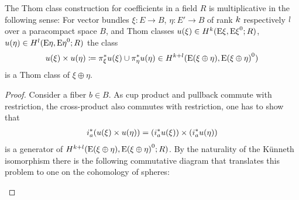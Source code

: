 \begin{Cor}\label{cor:thomclassmultiplicative} %
  The Thom class construction for coefficients in a field $R$ is
  multiplicative in the following sense:
  For vector bundles $\xi\colon E\to B$, $\eta\colon E'\to B$
  of rank $k$ respectively $l$ over a paracompact space $B$, and Thom
  classes
  ${u}(\xi)\in H^{k}(\mathrm{E}\xi, {\mathrm{E}\xi}^0; R)$,
  ${u}(\eta)\in H^{l}(\mathrm{E}\eta, {\mathrm{E}\eta}^0; R)$
  the class
  \begin{gather*}
    {u}(\xi)\times{u}(\eta)
    \coloneqq {\pi}^*_\xi{u}(\xi) \cup {\pi}^*_\eta{u}(\eta)
    \in H^{k+l}(\mathrm{E}(\xi\oplus\eta), {\mathrm{E}(\xi\oplus\eta)}^0)
  \end{gather*}
  is a Thom class of $\xi\oplus\eta$.
  \begin{proof}
    Consider a fiber $b\in B$. As cup product and pullback commute
    with restriction, the cross-product also commutes with
    restriction, \idest one has to show that
    \begin{gather*}
      {i}^*_a({u}(\xi)\times{u}(\eta))
      = \left({i}^*_a{u}(\xi)\right)
      \times \left({i}^*_a{u}(\eta)\right)
    \end{gather*}
    is a generator of
    $H^{k+l}(\mathrm{E}(\xi\oplus\eta), {\mathrm{E}(\xi\oplus\eta)}^0;R)$.
    By the naturality of the Künneth isomorphism there is the
    following commutative diagram that translates this problem to one
    on the cohomology of spheres:
    \begin{center}
\end{center}
\end{proof}
\end{Cor}
